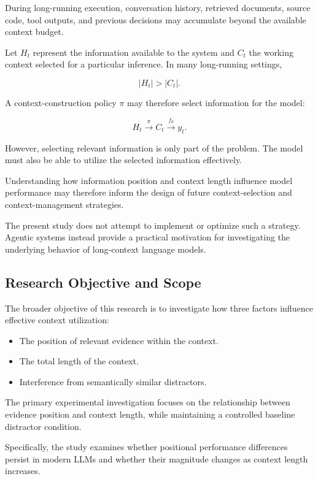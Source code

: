 During long-running execution, conversation history, retrieved documents,
source code, tool outputs, and previous decisions may accumulate beyond the
available context budget.

Let $H_t$ represent the information available to the system and $C_t$ the
working context selected for a particular inference. In many long-running
settings,

\[
    |H_t| > |C_t|.
\]

A context-construction policy $\pi$ may therefore select information for the
model:

\[
    H_t
    \xrightarrow{\pi}
    C_t
    \xrightarrow{f_{\theta}}
    y_t.
\]

However, selecting relevant information is only part of the problem. The model
must also be able to utilize the selected information effectively.

Understanding how information position and context length influence model
performance may therefore inform the design of future context-selection and
context-management strategies.

The present study does not attempt to implement or optimize such a strategy.
Agentic systems instead provide a practical motivation for investigating the
underlying behavior of long-context language models.

\subsection{Research Objective and Scope}

The broader objective of this research is to investigate how three factors
influence effective context utilization:

\begin{itemize}
    \item The position of relevant evidence within the context.
    \item The total length of the context.
    \item Interference from semantically similar distractors.
\end{itemize}

The primary experimental investigation focuses on the relationship between
evidence position and context length, while maintaining a controlled baseline
distractor condition.

Specifically, the study examines whether positional performance differences
persist in modern LLMs and whether their magnitude changes as context length
increases.

